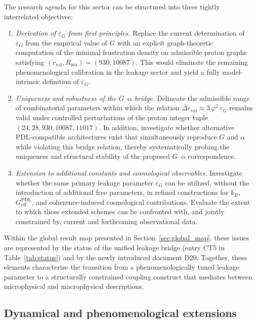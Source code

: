 \documentclass[11pt,a4paper]{article}
\newcommand{\PDL}{\mathrm{PDL}}
\begin{document}
The research agenda for this sector can be structured into three tightly interrelated objectives:
\begin{enumerate}[label=(\roman*), leftmargin=*]
  \item \emph{Derivation of $\varepsilon_G$ from first principles.}  Replace the current determination of $\varepsilon_G$ from the empirical value of $G$ with an explicit graph-theoretic computation of the minimal frustration density on admissible proton graphs satisfying $(r_{\mathrm{val}},R_{\mathrm{sea}})=(930,10087)$. This would eliminate the remaining phenomenological calibration in the leakage sector and yield a fully model-intrinsic definition of $\varepsilon_G$.
  \item \emph{Uniqueness and robustness of the $G$--$\alpha$ bridge.}  Delineate the admissible range of combinatorial parameters within which the relation $\Delta r_{\mathrm{val}} \approx 3\,\varphi^2\,\varepsilon_G$ remains valid under controlled perturbations of the proton integer tuple $(24,28,930,10087,11017)$. In addition, investigate whether alternative PDL-compatible architectures exist that simultaneously reproduce $G$ and $\alpha$ while violating this bridge relation, thereby systematically probing the uniqueness and structural stability of the proposed $G$--$\alpha$ correspondence.
  \item \emph{Extension to additional constants and cosmological observables.}  Investigate whether the same primary leakage parameter $\varepsilon_G$ can be utilized, without the introduction of additional free parameters, in refined constructions for $k_B$, $G_{\mathrm{eff}}^{\PDL}$, and coherence-induced cosmological contributions. Evaluate the extent to which these extended schemes can be confronted with, and jointly constrained by, current and forthcoming observational data.
\end{enumerate}
Within the global result map presented in Section~\ref{sec:global_map}, these issues are represented by the status of the unified leakage bridge (entry CT5 in Table~\ref{tab:status}) and by the newly introduced document D20. Together, these elements characterize the transition from a phenomenologically tuned leakage parameter to a structurally constrained coupling construct that mediates between microphysical and macrophysical descriptions.


\subsection{Dynamical and phenomenological extensions}
\label{subsec:roadmap_dynamical}
\end{document}
